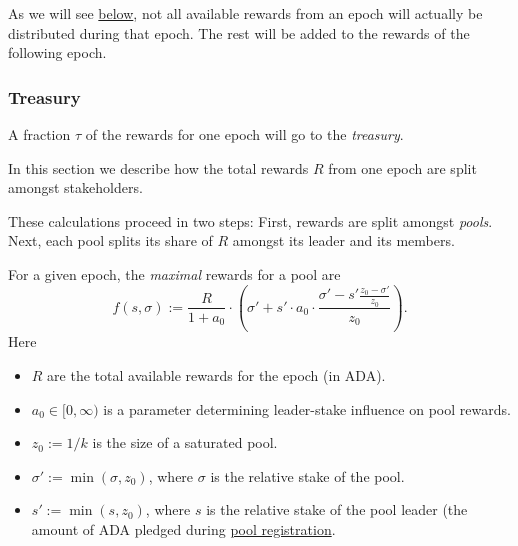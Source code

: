 \documentclass[11pt,a4paper]{article}
\begin{document}
As we will see \hyperref[pool-rewards]{below}, not all available rewards
from an epoch will actually be distributed during that epoch. The rest
will be added to the rewards of the following epoch.

\subsubsection{Treasury}\label{treasury}

A fraction \(\tau\) of the rewards for one epoch will go to the
\emph{treasury}.


In this section we describe how the total rewards \(R\) from one epoch
are split amongst stakeholders.

These calculations proceed in two steps: First, rewards are split
amongst \emph{pools}. Next, each pool splits its share of \(R\) amongst
its leader and its members.


For a given epoch, the \emph{maximal} rewards for a pool are \[
    f(s,\sigma) :=
    \frac{R}{1 + a_0}
    \cdot
    \left(\sigma' + s'\cdot a_0\cdot\frac{\sigma' - s'\frac{z_0-\sigma'}{z_0}}{z_0}\right).
\] Here

\begin{itemize}
\item
  \(R\) are the total available rewards for the epoch (in ADA).
\item
  \(a_0\in[0,\infty)\) is a parameter determining leader-stake influence
  on pool rewards.
\item
  \(z_0:=1/k\) is the size of a saturated pool.
\item
  \(\sigma':=\min(\sigma, z_0)\), where \(\sigma\) is the relative stake
  of the pool.
\item
  \(s':=\min(s, z_0)\), where \(s\) is the relative stake of the pool
  leader (the amount of ADA pledged during
  \hyperref[stake-pool-registration]{pool registration}.
\end{itemize}
\end{document}
